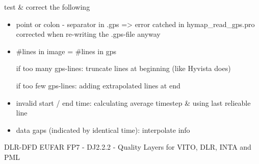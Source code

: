 %
{ %
test \& correct the following
\begin{itemize}
\item point or colon - separator in .gps => error catched in hymap\_read\_gps.pro corrected when re-writing the .gps-file anyway
\item \#lines in image  =  \#lines in gps

if too many gps-lines: truncate lines at beginning (like Hyvista does)

if too few gps-lines:  adding extrapolated lines at end
\item invalid start / end time: calculating average timestep \& using last relieable line
\item data gaps (indicated by identical time): interpolate info
\end{itemize}
}
%
{ %
DLR-DFD
}
%
{ %
EUFAR FP7 - DJ2.2.2 - Quality Layers for VITO, DLR, INTA and PML
}


